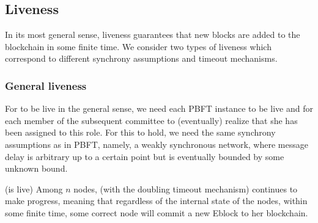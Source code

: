 \subsection{Liveness}
\label{section_properties_liveness}
In its most general sense, liveness guarantees that new blocks are added to the blockchain in some finite time. We consider two types of liveness which correspond to different synchrony assumptions and timeout mechanisms. 

\subsubsection*{General liveness}
For \name to be live in the general sense, we need each PBFT instance to be live and for each member of the subsequent committee to (eventually) realize that she has been assigned to this role. For this to hold, we need the same synchrony assumptions as in PBFT, namely, a weakly synchronous network, where message delay is arbitrary up to a certain point but is eventually bounded by some unknown bound. 
\begin{claim}{(\name is live)} 
Among $n$ nodes, \name (with the doubling timeout mechanism) continues to make progress, meaning that regardless of the internal state of the nodes, within some finite time, some correct node will commit a new Eblock to her blockchain.
\end{claim}
